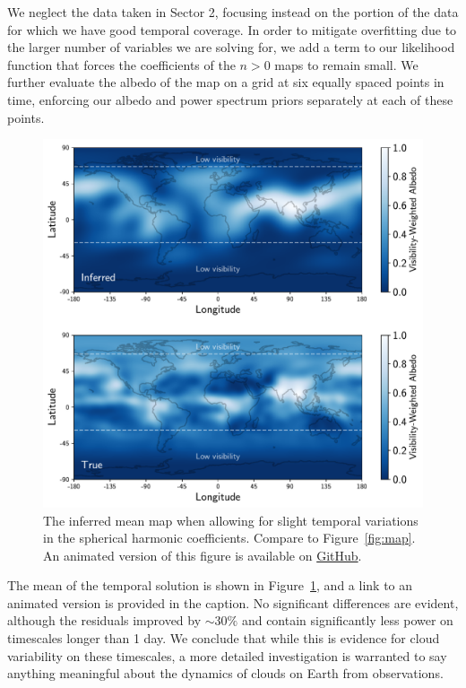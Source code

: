 \documentclass[modern]{aastex62}
\begin{document}
We neglect the data taken in Sector 2, focusing instead on the portion of the data for which
we have good temporal coverage. In order to mitigate overfitting due to
the larger number of variables we are solving for,
we add a term to our likelihood function that forces the coefficients
of the $n > 0$ maps to remain small. We further evaluate the albedo of the map
on a grid at six equally spaced points in time, enforcing our albedo and
power spectrum priors separately at each of these points.

\begin{figure}[p!]
    \begin{centering}
    \includegraphics[width=\linewidth]{figures/map_temporal.pdf}
    \caption{\label{fig:map_temporal}
             The inferred mean map when allowing for slight temporal
             variations in the spherical harmonic coefficients. Compare
             to Figure~\ref{fig:map}. An animated version of this figure
             is available on 
             \href{https://github.com/rodluger/earthshine/blob/master/tex/figures/map_temporal.mp4}{GitHub}.
             }
    \end{centering}
\end{figure}

The mean of the temporal solution is shown in Figure~\ref{fig:map_temporal},
and a link to an animated version is provided in the caption. No significant
differences are evident, although the residuals improved by ${\sim}30\%$
and contain significantly less power on timescales longer than 1 day.
We conclude that while this is evidence for cloud variability on these
timescales, a more detailed investigation is warranted to say anything
meaningful about the dynamics of clouds on Earth from \TESS observations.
\end{document}
